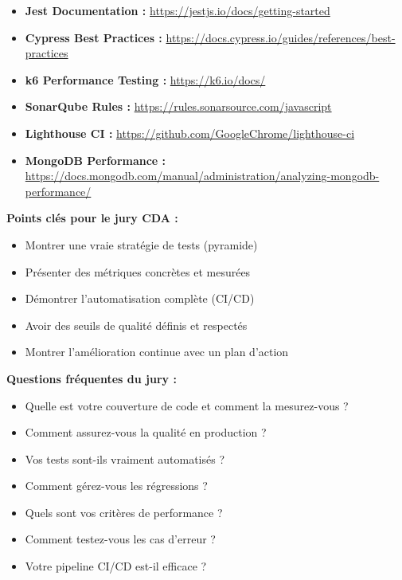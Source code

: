 \begin{itemize}
    \item \textbf{Jest Documentation :} \url{https://jestjs.io/docs/getting-started}
    \item \textbf{Cypress Best Practices :} \url{https://docs.cypress.io/guides/references/best-practices}
    \item \textbf{k6 Performance Testing :} \url{https://k6.io/docs/}
    \item \textbf{SonarQube Rules :} \url{https://rules.sonarsource.com/javascript}
    \item \textbf{Lighthouse CI :} \url{https://github.com/GoogleChrome/lighthouse-ci}
    \item \textbf{MongoDB Performance :} \url{https://docs.mongodb.com/manual/administration/analyzing-mongodb-performance/}
\end{itemize}

\begin{conseil}
\textbf{Points clés pour le jury CDA :}
\begin{itemize}
    \item Montrer une vraie stratégie de tests (pyramide)
    \item Présenter des métriques concrètes et mesurées
    \item Démontrer l'automatisation complète (CI/CD)
    \item Avoir des seuils de qualité définis et respectés
    \item Montrer l'amélioration continue avec un plan d'action
\end{itemize}
\end{conseil}

\begin{jury}
\textbf{Questions fréquentes du jury :}
\begin{itemize}
    \item Quelle est votre couverture de code et comment la mesurez-vous ?
    \item Comment assurez-vous la qualité en production ?
    \item Vos tests sont-ils vraiment automatisés ?
    \item Comment gérez-vous les régressions ?
    \item Quels sont vos critères de performance ?
    \item Comment testez-vous les cas d'erreur ?
    \item Votre pipeline CI/CD est-il efficace ?
\end{itemize}
\end{jury}